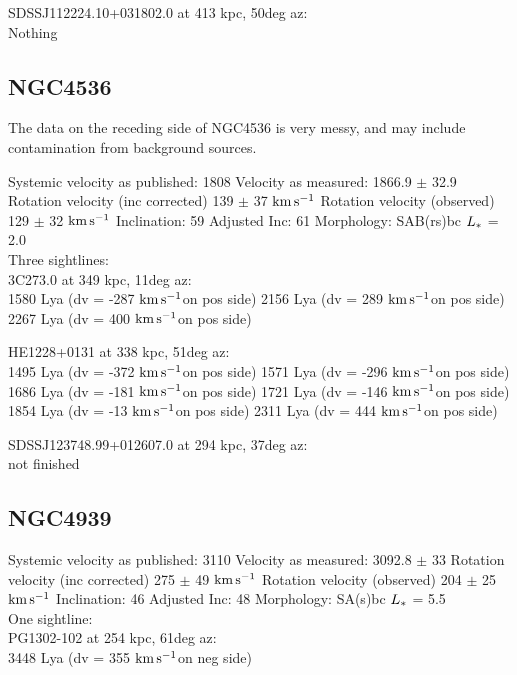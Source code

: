 \documentclass[iop]{emulateapj-rtx4}
\newcommand{\kms}{$\rm km\, s^{-1}$}
\begin{document}
SDSSJ112224.10+031802.0 at 413 kpc, 50deg az: \\
Nothing


\subsection{NGC4536}
The data on the receding side of NGC4536 is very messy, and may include contamination from background sources. 



Systemic velocity as published: 1808
Velocity as measured: 1866.9 $\pm$ 32.9
Rotation velocity (inc corrected) 139 $\pm$ 37 \kms
Rotation velocity (observed) 129 $\pm$ 32 \kms
Inclination: 59
Adjusted Inc: 61
Morphology: SAB(rs)bc
$L_{\**}$ = 2.0 \\

Three sightlines: \\
3C273.0 at 349 kpc, 11deg az: \\
1580 Lya (dv = -287 \kms on pos side)
2156 Lya (dv = 289 \kms on pos side)
2267 Lya (dv = 400 \kms on pos side)


HE1228+0131 at 338 kpc, 51deg az: \\
1495 Lya (dv = -372 \kms on pos side)
1571 Lya (dv = -296 \kms on pos side)
1686 Lya (dv = -181 \kms on pos side)
1721 Lya (dv = -146 \kms on pos side)
1854 Lya (dv = -13 \kms on pos side)
2311 Lya (dv = 444 \kms on pos side)

SDSSJ123748.99+012607.0 at  294 kpc, 37deg az: \\
not finished


\subsection{NGC4939}
Systemic velocity as published: 3110
Velocity as measured: 3092.8 $\pm$ 33
Rotation velocity (inc corrected) 275 $\pm$ 49 \kms
Rotation velocity (observed) 204 $\pm$ 25 \kms
Inclination: 46
Adjusted Inc: 48
Morphology: SA(s)bc
$L_{\**}$ = 5.5 \\

One sightline: \\
PG1302-102 at 254 kpc, 61deg az: \\
3448 Lya (dv = 355 \kms on neg side)
\end{document}
